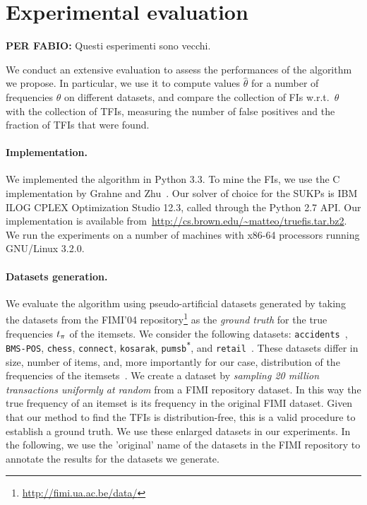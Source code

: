 \section{Experimental evaluation}\label{sec:experiments}

{\bf PER FABIO:} Questi esperimenti sono vecchi.

We conduct an extensive evaluation to assess the performances of the algorithm
we propose. In particular, we use it to compute values $\hat\theta$
for a number of frequencies $\theta$ on different datasets, and compare the
collection of FIs w.r.t.~$\hat\theta$ with the collection of TFIs, measuring
the number of false positives and the fraction of TFIs that were found.

\paragraph*{Implementation.}
We implemented the algorithm in Python 3.3. To mine the FIs, we use the C implementation by Grahne
and Zhu~\citep{GrahneZ03}. Our solver of choice for the SUKPs is
IBM\textsuperscript{\textregistered}
ILOG\textsuperscript{\textregistered} CPLEX\textsuperscript{\textregistered}
Optimization Studio 12.3, called through the Python 2.7 API.
Our implementation is available
from~\url{http://cs.brown.edu/~matteo/truefis.tar.bz2}. We run the experiments
on a number of machines with x86-64 processors running GNU/Linux 3.2.0.

\paragraph*{Datasets generation.}\label{sec:dsgen}
We evaluate the algorithm using pseudo-artificial datasets generated by taking the datasets from the FIMI'04
repository\footnote{\url{http://fimi.ua.ac.be/data/}} as the \emph{ground truth} for the true frequencies
$t_\pi$ of the itemsets. We consider the following datasets:
\texttt{accidents}~\citep{GeurtsWBV03}, \texttt{BMS-POS}, \texttt{chess},
\texttt{connect}, \texttt{kosarak}, \texttt{pumsb\textsuperscript{*}}, and
\texttt{retail}~\citep{BrijsSVW99}. These datasets differ in size, number of
items, and, more importantly for our case, distribution of the frequencies of the
itemsets~\citep{GoethalsZ04}. We create a dataset by \emph{sampling 20 million
transactions uniformly at random} from a FIMI repository dataset. In this way
the true frequency of an itemset is its frequency in the original FIMI dataset.
Given that our method to find the TFIs is distribution-free, this is a valid
procedure to establish a ground truth. We use these enlarged datasets in our
experiments. In the following, we use the 'original' name of the datasets in the
FIMI repository to annotate the results for the datasets we generate.

